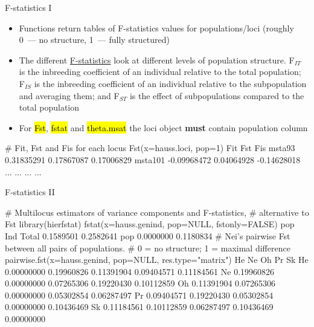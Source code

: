 \documentclass[compress, ucs, xelatex, 11pt, xcolor=svgnames,
	hyperref={
		bookmarks=true,
		unicode=true,
		colorlinks=true,
		pdftitle={Molecular data in R},
		plainpages=false,
		pdfauthor={Vojtech Zeisek},
		pdfsubject={Course about phylogeny and evolution in R},
		pdfcreator={XeLaTeX},
		pdfkeywords={R, evolution, phylogeny, molecular data},
		linkcolor=Tomato,
		anchorcolor=SaddleBrown,
		citecolor=Goldenrod,
		filecolor=DarkMagenta,
		menucolor=Sienna,
		urlcolor=DarkTurquoise,
		pdftex},
	url={hyphens, lowtilde} %
	]{beamer}
\renewcommand{\texttt}[1]{\hl{\ttfamily #1}}
\begin{document}
\begin{frame}[fragile]{F-statistics I}
	\begin{itemize}
		\item Functions return tables of F-statistics values for populations/loci (roughly 0~--- no structure, 1~--- fully structured)
		\item The different \href{https://en.wikipedia.org/wiki/F-statistics}{F-statistics} look at different levels of population structure. F$_{IT}$ is the inbreeding coefficient of an individual relative to the total population; F$_{IS}$ is the inbreeding coefficient of an individual relative to the subpopulation and averaging them; and F$_{ST}$ is the effect of subpopulations compared to the total population
		\item For \texttt{Fst}, \texttt{fstat} and \texttt{theta.msat} the loci object \textbf{must} contain population column
	\end{itemize}
	\begin{spluscode}
    # Fit, Fst and Fis for each locus
    Fst(x=hauss.loci, pop=1)
                    Fit        Fst         Fis
    msta93   0.31835291 0.17867087  0.17006829
    msta101 -0.09968472 0.04064928 -0.14628018
        ...         ...        ...         ...
	\end{spluscode}
\end{frame}

\begin{frame}[fragile]{F-statistics II}
	\begin{spluscode}
    # Multilocus estimators of variance components and F-statistics,
    # alternative to Fst
    library(hierfstat)
    fstat(x=hauss.genind, pop=NULL, fstonly=FALSE)
                pop       Ind
    Total 0.1589501 0.2582641
    pop   0.0000000 0.1180834
    # Nei's pairwise Fst between all pairs of populations.
    # 0 = no structure; 1 = maximal difference
    pairwise.fst(x=hauss.genind, pop=NULL, res.type="matrix")
               He         Ne         Oh         Pr         Sk
    He 0.00000000 0.19960826 0.11391904 0.09404571 0.11184561
    Ne 0.19960826 0.00000000 0.07265306 0.19220430 0.10112859
    Oh 0.11391904 0.07265306 0.00000000 0.05302854 0.06287497
    Pr 0.09404571 0.19220430 0.05302854 0.00000000 0.10436469
    Sk 0.11184561 0.10112859 0.06287497 0.10436469 0.00000000
	\end{spluscode}
\end{frame}
\end{document}
